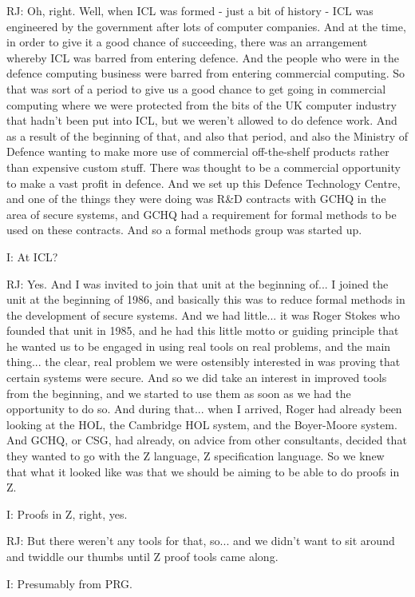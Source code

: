 \documentclass[10pt,titlepage]{book}
\begin{document}
RJ: Oh, right. Well, when ICL was formed - just a bit of history - ICL was engineered by the government after lots of computer companies. And at the time, in order to give it a good chance of succeeding, there was an arrangement whereby ICL was barred from entering defence. And the people who were in the defence computing business were barred from entering commercial computing. So that was sort of a period to give us a good chance to get going in commercial computing where we were protected from the bits of the UK computer industry that hadn't been put into ICL, but we weren't allowed to do defence work. And as a result of the beginning of that, and also that period, and also the Ministry of Defence wanting to make more use of commercial off-the-shelf products rather than expensive custom stuff. There was thought to be a commercial opportunity to make a vast profit in defence. And we set up this Defence Technology Centre, and one of the things they were doing was R\&D contracts with GCHQ in the area of secure systems, and GCHQ had a requirement for formal methods to be used on these contracts. And so a formal methods group was started up.

I: At ICL?

RJ: Yes. And I was invited to join that unit at the beginning of... I joined the unit at the beginning of 1986, and basically this was to reduce formal methods in the development of secure systems. And we had little... it was Roger Stokes who founded that unit in 1985, and he had this little motto or guiding principle that he wanted us to be engaged in using real tools on real problems, and the main thing... the clear, real problem we were ostensibly interested in was proving that certain systems were secure. And so we did take an interest in improved tools from the beginning, and we started to use them as soon as we had the opportunity to do so. And during that... when I arrived, Roger had already been looking at the HOL, the Cambridge HOL system, and the Boyer-Moore system. And GCHQ, or CSG, had already, on advice from other consultants, decided that they wanted to go with the Z language, Z specification language. So we knew that what it looked like was that we should be aiming to be able to do proofs in Z.

I: Proofs in Z, right, yes.

RJ: But there weren't any tools for that, so... and we didn't want to sit around and twiddle our thumbs until Z proof tools came along.

I: Presumably from PRG.
\end{document}
